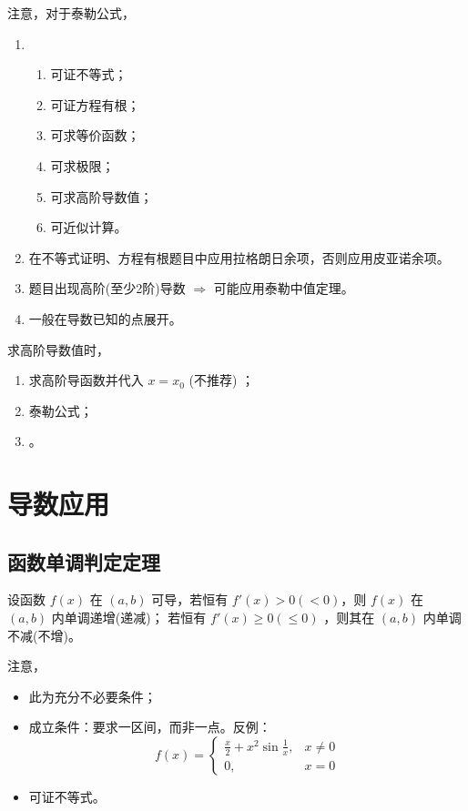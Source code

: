 注意，对于泰勒公式，
\begin{enumerate}
    \item \begin{enumerate}
        \item 可证不等式；
        \item 可证方程有根；
        \item 可求等价函数；
        \item 可求极限；
        \item 可求高阶导数值；
        \item 可近似计算。
    \end{enumerate}
    \item 在不等式证明、方程有根题目中应用拉格朗日余项，否则应用皮亚诺余项。
    \item 题目出现高阶(至少2阶)导数 $ \Rightarrow $ 可能应用泰勒中值定理。
    \item 一般在导数已知的点展开。
\end{enumerate}

求高阶导数值时， 
\begin{enumerate}
    \item 求高阶导函数并代入 $ x=x_0 $ (不推荐) ；
    \item 泰勒公式；
    \item {}。
\end{enumerate}

\section{导数应用}

\subsection{函数单调判定定理}

\begin{Theo}[函数单调判定定理]

    设函数 $ f(x) $ 在 $ (a,b) $ 可导，若恒有 $ f'(x)>0(<0) $，则 $ f(x) $ 在 $ (a,b) $ 内单调递增(递减)；
    若恒有 $ f'(x)\geq0(\leq 0) $ ，则其在 $ (a,b) $ 内单调不减(不增)。
\end{Theo}

注意，\begin{itemize}
    \item 此为充分不必要条件；
    \item 成立条件：要求一区间，而非一点。反例：$$
        f(x)=\begin{cases}
            \frac{x}{2}+x^2\sin \frac{1}{x},& x\neq 0\\
            0,& x=0
        \end{cases}
    $$ 
    \item 可证不等式。
\end{itemize}

